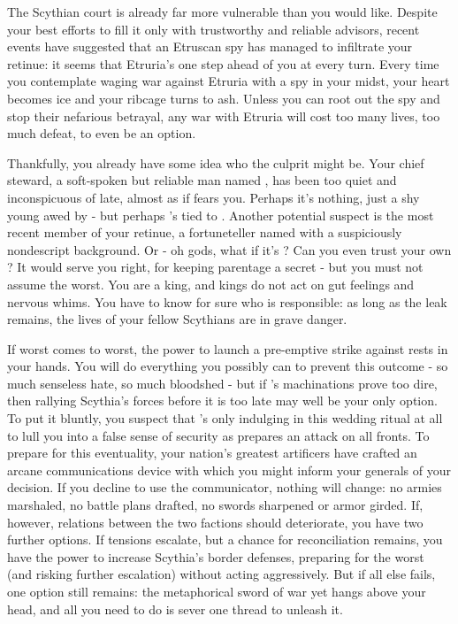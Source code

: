 \documentclass[char]{Kos}
\begin{document}
    The Scythian court is already far more vulnerable than you would like. Despite your best efforts to fill it only with trustworthy and reliable advisors, recent events have suggested that an Etruscan spy has managed to infiltrate your retinue: it seems that Etruria's one step ahead of you at every turn. Every time you contemplate waging war against Etruria with a spy in your midst, your heart becomes ice and your ribcage turns to ash. Unless you can root out the spy and stop their nefarious betrayal, any war with Etruria will cost too many lives, too much defeat, to even be an option. 

    Thankfully, you already have some idea who the culprit might be. Your chief steward, a soft-spoken but reliable man named \cButler{}, has been too quiet and inconspicuous of late, almost as if \cButler{\they} fears you. Perhaps it's nothing, just a shy young \cButler{\human} awed by \cButler{\their} \cScythiaKing{\monarch} - but perhaps \cButler{\they}'s tied to \cEtruriaKing{}. Another potential suspect is the most recent member of your retinue, a fortuneteller named \cBurglar{} with a suspiciously nondescript background. Or - oh gods, what if it's \cWard{}? Can you even trust your own \cWard{\offspring}? It would serve you right, for keeping \cWard{\their} parentage a secret - but you must not assume the worst. You are a king, and kings do not act on gut feelings and nervous whims. You have to know for sure who is responsible: as long as the leak remains, the lives of your fellow Scythians are in grave danger.

    If worst comes to worst, the power to launch a pre-emptive strike against \cEtruriaKing{} rests in your hands. You will do everything you possibly can to prevent this outcome - so much senseless hate, so much bloodshed - but if \cEtruriaKing{}'s machinations prove too dire, then rallying Scythia's forces before it is too late may well be your only option. To put it bluntly, you suspect that \cEtruriaKing{\they}'s only indulging in this wedding ritual at all to lull you into a false sense of security as \cEtruriaKing{\they} prepares an attack on all fronts. To prepare for this eventuality, your nation's greatest artificers have crafted an arcane communications device with which you might inform your generals of your decision. If you decline to use the communicator, nothing will change: no armies marshaled, no battle plans drafted, no swords sharpened or armor girded. If, however, relations between the two factions should deteriorate, you have two further options. If tensions escalate, but a chance for reconciliation remains, you have the power to increase Scythia's border defenses, preparing for the worst (and risking further escalation) without acting aggressively. But if all else fails, one option still remains: the metaphorical sword of war yet hangs above your head, and all you need to do is sever one thread to unleash it.
\end{document}
